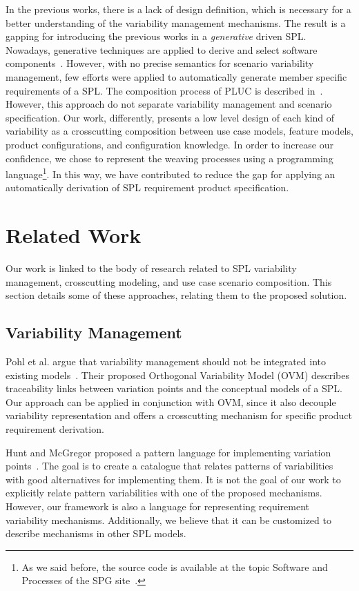\documentclass{acm_proc_article-sp}
\begin{document}
In the previous works, there is a lack of design definition, which
is necessary for a better understanding of the variability
management mechanisms. The result is a gapping for introducing the
previous works in a \emph{generative} driven SPL. Nowadays,
generative techniques are applied to derive and select software
components~\cite{czarnecki-book,greenfield-softwarefactories,butler-icse-2001,krueger-cacm-200712}. 
However, with no precise semantics for scenario variability management, few efforts were
applied to automatically generate member specific requirements of a
SPL. The composition process of PLUC is described in~\cite{fantechi-splc-2004}. 
However, this approach do not separate variability management and scenario 
specification. Our work, differently, presents a low level design of each
kind of variability as a crosscutting composition between use case models, feature models, product 
configurations, and configuration knowledge. In order to increase our confidence, we chose
to represent the weaving processes using a programming
language\footnote{As we said before, the source code is available at
the topic Software and Processes of the SPG site~\cite{spg-url}.}.
In this way, we have contributed to reduce the gap for applying an
automatically derivation of SPL requirement product specification.

\section{Related Work}
\label{sec:related}

Our work is linked to the body of research related to SPL
variability management, crosscutting modeling, and use case scenario
composition. This section details some of these approaches, relating
them to the proposed solution.

\subsection{Variability Management}

Pohl et al. argue that variability management should not be
integrated into existing models~\cite{phol-spl-book}. Their proposed
Orthogonal Variability Model (OVM) describes traceability links
between variation points and the conceptual models of a SPL. Our
approach can be applied in conjunction with OVM, since it also
decouple variability representation and offers a crosscutting
mechanism for specific product requirement derivation.

Hunt and McGregor proposed a pattern language for implementing
variation points~\cite{hunt-splc-2006}. The goal is to create a
catalogue that relates patterns of variabilities with good
alternatives for implementing them. It is not the goal of our work
to explicitly relate pattern variabilities with one of the proposed
mechanisms. However, our framework is also a language for
representing requirement variability mechanisms. Additionally, we
believe that it can be customized to describe mechanisms in other
SPL models.
\end{document}
